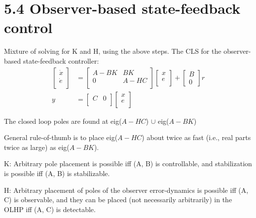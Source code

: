 \section*{5.4 Observer-based state-feedback control}
Mixture of solving for K and H, using the above steps. The CLS for the observer-based state-feedback controller:
\begin{equation*}
    \begin{aligned}
        \begin{bmatrix}
            \dot{x} \\
            \dot{e} \\
        \end{bmatrix}
          & = \begin{bmatrix}
            A-BK & BK   \\
            0    & A-HC \\
        \end{bmatrix}\begin{bmatrix}
            x \\
            e \\
        \end{bmatrix} + \begin{bmatrix}
            B \\
            0
        \end{bmatrix} r \\
        y & = \begin{bmatrix}
            C & 0 \\
        \end{bmatrix} \begin{bmatrix}
            x \\
            e \\
        \end{bmatrix}
    \end{aligned}
\end{equation*}

The closed loop poles are found at eig(\(A-HC\)) \(\cup\) eig(\(A-BK\))

General rule-of-thumb is to place eig(\(A-HC\)) about twice as fast (i.e., real parts twice as large) as eig(\(A-BK\)).

K: Arbitrary pole placement is possible iff (A, B) is controllable, and stabilization is possible iff (A, B) is stabilizable.

H: Arbitrary placement of poles of the observer error-dynamics is possible iff (A, C) is observable, and they can be placed (not necessarily arbitrarily) in the OLHP iff (A, C) is detectable.

